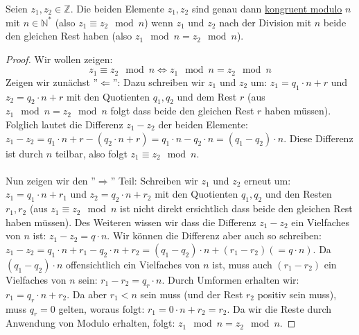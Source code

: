 \documentclass[../../main.tex]{subfiles}
\begin{document}
	\begin{theorem}
		\label{satz:kongruentModuloN}
		Seien $z_1, z_2 \in \mathbb{Z}$. Die beiden Elemente $z_1,z_2$ sind genau dann \hyperref[def:kongruentModuloN]{kongruent modulo} $n$ mit $n \in \mathbb{N}^*$ (also $z_1 \equiv z_2 \mod n$) wenn $z_1$ und $z_2$ nach der Division mit $n$ beide den gleichen Rest haben (also $z_1 \mod n = z_2 \mod n$).
		\begin{proof}
			Wir wollen zeigen: $$z_1 \equiv z_2 \mod n \Leftrightarrow z_1 \mod n = z_2 \mod n$$ Zeigen wir zunächst ''$\Leftarrow$'': Dazu schreiben wir $z_1$ und $z_2$ um: $z_1 = q_1 \cdot n + r$ und $z_2 = q_2 \cdot n + r$ mit den Quotienten $q_1,q_2$ und dem Rest $r$ (aus $z_1 \mod n = z_2 \mod n$ folgt dass beide den gleichen Rest $r$ haben müssen). Folglich lautet die Differenz $z_1-z_2$ der beiden Elemente: $z_1 - z_2 = q_1 \cdot n + r - (q_2 \cdot n + r) = q_1 \cdot n - q_2 \cdot n = (q_1 - q_2) \cdot n$. Diese Differenz ist durch $n$ teilbar, also folgt $z_1 \equiv z_2 \mod n$. \\ \\
			Nun zeigen wir den ''$\Rightarrow$'' Teil: Schreiben wir $z_1$ und $z_2$ erneut um: $z_1 = q_1 \cdot n + r_1$ und $z_2 = q_2 \cdot n + r_2$ mit den Quotienten $q_1,q_2$ und den Resten $r_1,r_2$ (aus $z_1 \equiv z_2 \mod n$ ist nicht direkt ersichtlich dass beide den gleichen Rest haben müssen). Des Weiteren wissen wir dass die Differenz $z_1-z_2$ ein Vielfaches von $n$ ist: $z_1-z_2 = q \cdot n$. Wir können die Differenz aber auch so schreiben: $z_1 - z_2 = q_1 \cdot n + r_1 - q_2 \cdot n + r_2 = (q_1-q_2) \cdot n + (r_1-r_2) (=q \cdot n)$. Da $(q_1-q_2) \cdot n$ offensichtlich ein Vielfaches von $n$ ist, muss auch $(r_1-r_2)$ ein Vielfaches von $n$ sein: $r_1-r_2=q_r \cdot n$. Durch Umformen erhalten wir: $r_1 = q_r\cdot n + r_2$. Da aber $r_1 < n$ sein muss (und der Rest $r_2$ positiv sein muss), muss $q_r=0$ gelten, woraus folgt: $r_1 = 0 \cdot n + r_2 = r_2$. Da wir die Reste durch Anwendung von Modulo erhalten, folgt: $z_1 \mod n = z_2 \mod n$.
		\end{proof}
	\end{theorem}
\end{document}
